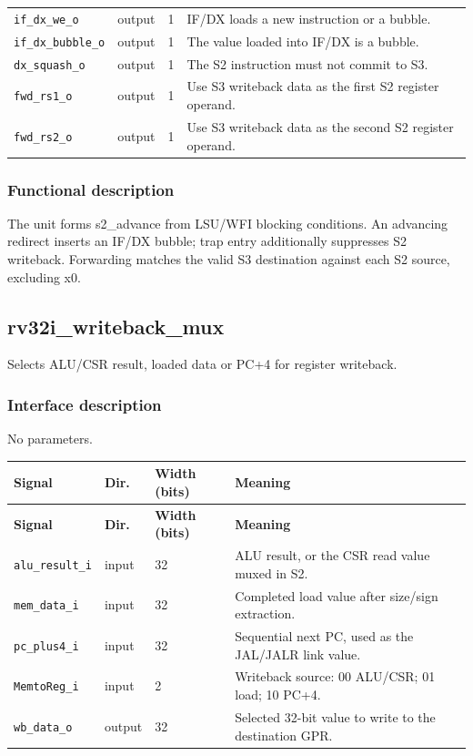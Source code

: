 \documentclass[11pt]{article}
\begin{document}
{\begin{longtable}{@{}L{0.3400\dimexpr\linewidth-36pt\relax}L{0.1000\dimexpr\linewidth-36pt\relax}L{0.1000\dimexpr\linewidth-36pt\relax}L{0.4600\dimexpr\linewidth-36pt\relax}@{}}
\texttt{if\_dx\_we\_o} & output & 1 & IF/DX loads a new instruction or a bubble. \\ \addlinespace[3pt]
\texttt{if\_dx\_bubble\_o} & output & 1 & The value loaded into IF/DX is a bubble. \\ \addlinespace[3pt]
\texttt{dx\_squash\_o} & output & 1 & The S2 instruction must not commit to S3. \\ \addlinespace[3pt]
\texttt{fwd\_rs1\_o} & output & 1 & Use S3 writeback data as the first S2 register operand. \\ \addlinespace[3pt]
\texttt{fwd\_rs2\_o} & output & 1 & Use S3 writeback data as the second S2 register operand. \\*
\bottomrule\end{longtable}}
\subsubsection{Functional description}
\noindent The unit forms s2\_advance from LSU/WFI blocking conditions. An advancing redirect inserts an IF/DX bubble; trap entry additionally suppresses S2 writeback. Forwarding matches the valid S3 destination against each S2 source, excluding x0.\par\medskip

\subsection{rv32i\_writeback\_mux}
Selects ALU/CSR result, loaded data or PC+4 for register writeback.
\subsubsection{Interface description}
\noindent No parameters.\par\medskip
{\small
\begin{longtable}{@{}L{0.3400\dimexpr\linewidth-36pt\relax}L{0.1000\dimexpr\linewidth-36pt\relax}L{0.1000\dimexpr\linewidth-36pt\relax}L{0.4600\dimexpr\linewidth-36pt\relax}@{}}
\toprule
\textbf{Signal} & \textbf{Dir.} & \textbf{Width (bits)} & \textbf{Meaning} \\ \midrule
\endfirsthead
\toprule
\textbf{Signal} & \textbf{Dir.} & \textbf{Width (bits)} & \textbf{Meaning} \\ \midrule
\endhead
\texttt{alu\_result\_i} & input & 32 & ALU result, or the CSR read value muxed in S2. \\ \addlinespace[3pt]
\texttt{mem\_data\_i} & input & 32 & Completed load value after size/sign extraction. \\ \addlinespace[3pt]
\texttt{pc\_plus4\_i} & input & 32 & Sequential next PC, used as the JAL/JALR link value. \\ \addlinespace[3pt]
\texttt{MemtoReg\_i} & input & 2 & Writeback source: 00 ALU/CSR; 01 load; 10 PC+4. \\ \addlinespace[3pt]
\texttt{wb\_data\_o} & output & 32 & Selected 32-bit value to write to the destination GPR. \\*
\bottomrule\end{longtable}}
\end{document}
